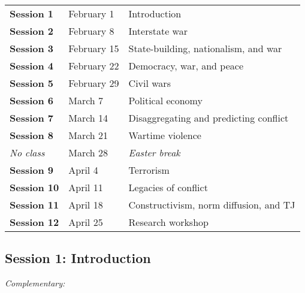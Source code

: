 \documentclass[12pt, a4paper]{article}
\begin{document}

 \begin{table*}[!ht]
   \centering

   \begin{tabular}{lll}
     \textbf{Session 1} & February 1 & Introduction \\
     \textbf{Session 2} & February 8 & Interstate war \\
     \textbf{Session 3} & February 15 & State-building, nationalism, and war \\
     \textbf{Session 4} & February 22 & Democracy, war, and peace \\
     \textbf{Session 5} & February 29 & Civil wars \\
     \textbf{Session 6} & March 7 & Political economy \\
     \textbf{Session 7} & March 14 & Disaggregating and predicting conflict \\
     \textbf{Session 8} & March 21 & Wartime violence \\
     \textit{No class} & March 28 & \textit{Easter break} \\
     \textbf{Session 9} & April 4 & Terrorism \\
     \textbf{Session 10} & April 11 & Legacies of conflict \\
     \textbf{Session 11} & April 18 & Constructivism, norm diffusion, and TJ \\
		 \textbf{Session 12} & April 25 & Research workshop \\
   \end{tabular}
 \end{table*}

\hline

\subsection*{Session 1: Introduction}

\noindent\textit{Complementary:}
\end{document}
